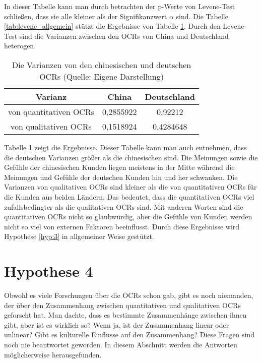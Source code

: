 In dieser Tabelle kann man durch betrachten der p-Werte von Levene-Test schließen, dass sie alle kleiner als der Signifikanzwert $\alpha$ sind. Die Tabelle \ref{tab:levene_allgemein} stützt die Ergebnisse von Tabelle \ref{tab:varianz_allgemein}. Durch den Levene-Test sind die Varianzen zwischen den \ac{OCRs} von China und Deutschland heterogen.

\begin{table}[htb]
\centering
\begin{tabular}{|c|c|c|}
\hline
Varianz                & China     & Deutschland \\ \hline
von quantitativen \ac{OCRs} & 0,2855922 & 0,92212     \\ \hline
von qualitativen \ac{OCRs}  & 0,1518924 & 0,4284648   \\ \hline
\end{tabular}
\caption[Die Varianzen von den chinesischen und deutschen OCRs]{Die Varianzen von den chinesischen und deutschen \ac{OCRs} (Quelle: Eigene Darstellung)}
\label{tab:varianz_allgemein}
\end{table}

Tabelle \ref{tab:varianz_allgemein} zeigt die Ergebnisse. Dieser Tabelle kann man auch entnehmen, dass die deutschen Varianzen größer als die chinesischen sind. Die Meinungen sowie die Gefühle der chinesischen Kunden liegen meistens in der Mitte während die Meinungen und Gefühle der deutschen Kunden hin und her schwanken. Die Varianzen von qualitativen \ac{OCRs} sind kleiner als die von quantitativen \ac{OCRs} für die Kunden aus beiden Ländern. Das bedeutet, dass die quantitativen \ac{OCRs} viel zufallsbedingter als die qualitativen \ac{OCRs} sind. Mit anderen Worten sind die quantitativen \ac{OCRs} nicht so glaubwürdig, aber die Gefühle von Kunden werden nicht so viel von externen Faktoren beeinflusst. Durch diese Ergebnisse wird Hypothese \ref{hyp:3} in allgemeiner Weise gestützt.
\section{Hypothese 4} \label{sec:h4}
Obwohl es viele Forschungen über die \acl{OCRs} schon gab, gibt es noch niemanden, der über den Zusammenhang zwischen quantitativen und qualitativen \ac{OCRs} geforscht hat. Man dachte, dass es bestimmte Zusammenhänge zwischen ihnen gibt, aber ist es wirklich so? Wenn ja, ist der Zusammenhang linear oder unlinear? Gibt es kulturelle Einflüsse auf den Zusammenhang? Diese Fragen sind noch nie beantwortet geworden. In diesem Abschnitt werden die Antworten möglicherweise herausgefunden.
